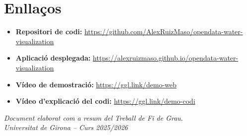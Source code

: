 \documentclass[11pt, a4paper]{article}
\begin{document}
\section{Enllaços}

\begin{itemize}[leftmargin=*]
    \item \textbf{Repositori de codi:} \url{https://github.com/AlexRuizMaso/opendata-water-visualization}

    \item \textbf{Aplicació desplegada:} \url{https://alexruizmaso.github.io/opendata-water-visualization}

    \item \textbf{Vídeo de demostració:} \url{https://ggl.link/demo-web}

    \item \textbf{Vídeo d'explicació del codi:} \url{https://ggl.link/demo-codi}
\end{itemize}

\vfill

\begin{center}
\textit{Document elaborat com a resum del Treball de Fi de Grau.}\\
\textit{Universitat de Girona -- Curs 2025/2026}
\end{center}
\end{document}
